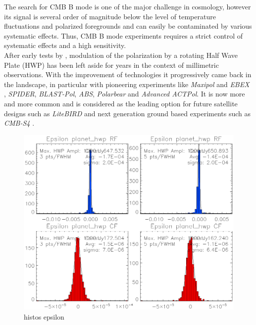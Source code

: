 The search for CMB B mode is one of the major challenge in cosmology, however its signal is several order of magnitude below the level of temperature fluctuations and polarized foregrounds and can easily be contaminated by various systematic effects. Thus, CMB B mode experiments requires a strict control of systematic effects and a high sensitivity. \\
After early tests by \citep{1984ApJ...284L..51H}, modulation of the polarization by a rotating Half Wave Plate (HWP) has been left aside for  years in the context of millimetric observations. With the improvement of technologies it progressively came back in the landscape, in particular with pioneering experiments like \emph{Maxipol} \citep{2007ApJ...665...42J} and \emph{EBEX} \citep{2010SPIE.7741E..1CR}, \emph{SPIDER}, \emph{BLAST-Pol}, \emph{ABS}, \emph{Polarbear} and \emph{Advanced ACTPol}. It is now more and more common and is considered as the leading option for future satellite designs such as \emph{LiteBIRD} \citep{2014JLTP..176..733M} and next generation ground based experiments such as \emph{CMB-S4} \citep{2016arXiv161002743A}.

\begin{figure}
	\includegraphics[clip, angle=0, width=\columnwidth]{Figures/histos_epsilon.eps}
	\caption{histos epsilon}
	\label{fig:histos_epsilon}
\end{figure}
